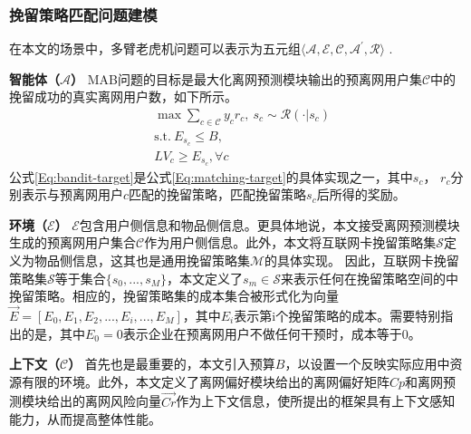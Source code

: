 \subsubsection{挽留策略匹配问题建模}
在本文的场景中，多臂老虎机问题可以表示为五元组$\langle \mathcal{A}, \mathcal{E}, \mathcal{C}, \mathcal{A}^{'}, \mathcal{R}\rangle$ . \par
\textbf{智能体（$\mathcal{A}$）}  %
MAB问题的目标是最大化离网预测模块输出的预离网用户集$\mathcal{C}$中的挽留成功的真实离网用户数，如下所示。
\begin{equation}
	\begin{aligned}
		& \max \sum_{c \in \mathcal{C}} y_{c} r_{c}, ~ s_{c} \sim \mathcal{R}(\cdot|s_{c}) \\
		& \mathrm{s.t.} ~ E_{s_{c}} \leq B ,\\
		& LV_{c} \geq E_{s_{c}}, \forall c			
	\end{aligned}
	\label{Eq:bandit-target}
\end{equation}		
公式\eqref{Eq:bandit-target}是公式\eqref{Eq:matching-target}的具体实现之一，其中$s_{c}$， $r_{c}$分别表示与预离网用户${c}$匹配的挽留策略，匹配挽留策略$s_{c}$后所得的奖励。

\par
\textbf{环境（$\mathcal{E}$）} %
$\mathcal{E}$包含用户侧信息和物品侧信息。更具体地说，本文接受离网预测模块生成的预离网用户集合$\mathcal{C}$作为用户侧信息。此外，本文将互联网卡挽留策略集$\mathcal{S}$定义为物品侧信息，这其也是通用挽留策略集$\mathcal{M}$的具体实现。
因此，互联网卡挽留策略集$\mathcal{S}$等于集合$\{s_{0}, ..., s_{M}\}$，本文定义了$s_{m} \in \mathcal{S}$来表示任何在挽留策略空间的中挽留策略。相应的，挽留策略集的成本集合被形式化为向量$\vec{E} = [E_{0}, E_{1}, E_{2}, ..., E_{i},..., E_{M}]$，其中$E_{i}$表示第i个挽留策略的成本。需要特别指出的是，其中$E_{0} = 0$表示企业在预离网用户不做任何干预时，成本等于0。 \par
\par

\textbf{上下文（$\mathcal{C}$）} %
首先也是最重要的，本文引入预算$B$，以设置一个反映实际应用中资源有限的环境。此外，本文定义了离网偏好模块给出的离网偏好矩阵$Cp$和离网预测模块给出的离网风险向量$\vec{Cr}$作为上下文信息，使所提出的框架具有上下文感知能力，从而提高整体性能。

